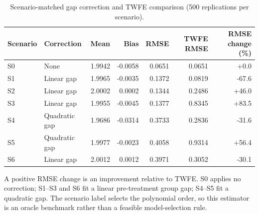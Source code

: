\begin{table}[htbp]
\centering\small
\caption{Scenario-matched gap correction and TWFE comparison (500 replications per scenario).}\label{tab:matched}
\begin{tabular}{llrrrrr}
\toprule
Scenario & Correction & Mean & Bias & RMSE & TWFE RMSE & RMSE change (\%) \\
\midrule
S0 & None & 1.9942 & -0.0058 & 0.0651 & 0.0651 & +0.0 \\
S1 & Linear gap & 1.9965 & -0.0035 & 0.1372 & 0.0819 & -67.6 \\
S2 & Linear gap & 2.0002 & 0.0002 & 0.1344 & 0.2486 & +46.0 \\
S3 & Linear gap & 1.9955 & -0.0045 & 0.1377 & 0.8345 & +83.5 \\
S4 & Quadratic gap & 1.9686 & -0.0314 & 0.3733 & 0.2836 & -31.6 \\
S5 & Quadratic gap & 1.9977 & -0.0023 & 0.4058 & 0.9314 & +56.4 \\
S6 & Linear gap & 2.0012 & 0.0012 & 0.3971 & 0.3052 & -30.1 \\
\bottomrule
\end{tabular}
\par\smallskip\begin{minipage}{0.96\linewidth}\footnotesize A positive RMSE change is an improvement relative to TWFE. S0 applies no correction; S1--S3 and S6 fit a linear pre-treatment group gap; S4--S5 fit a quadratic gap. The scenario label selects the polynomial order, so this estimator is an oracle benchmark rather than a feasible model-selection rule.\end{minipage}
\end{table}
